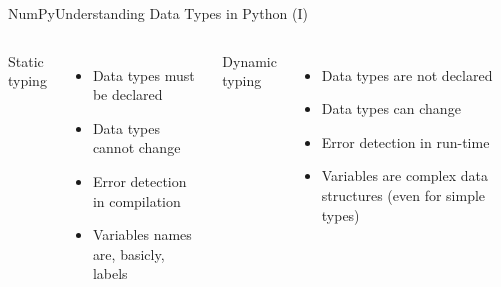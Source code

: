 \documentclass[10pt,compress]{beamer} %
\begin{document}
\begin{frame}{NumPy}{Understanding Data Types in Python (I)}

    \begin{columns}
			
			\begin{block}{\footnotesize{Static typing}}
			\vspace{-0.2cm} 
				
			\vspace{-0.2cm} 
			\end{block}

			\begin{itemize}
				\item Data types must be declared
				\item Data types cannot change
				\item Error detection in compilation
				\item Variables names are, basicly, labels
			\end{itemize}
			
			\begin{block}{\footnotesize{Dynamic typing}}
			\vspace{-0.2cm} 
				
			\vspace{-0.2cm} 
			\end{block}

			\begin{itemize}
				\item Data types are not declared
				\item Data types can change
				\item Error detection in run-time
				\item Variables are complex data structures (even for simple types)
			\end{itemize}
	\end{columns}
\end{frame}
\end{document}
